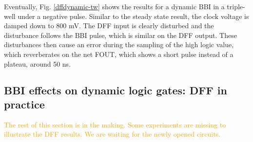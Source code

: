 		
		Eventually, Fig. \ref{dffdynamic-tw} shows the results for a dynamic BBI in a triple-well under a negative pulse.
		Similar to the steady state result, the clock voltage is damped down to 800 mV.
		The DFF input is clearly disturbed and the disturbance follows the BBI pulse, which is similar on the DFF output.
		These disturbances then cause an error during the sampling of the high logic value, which reverberates on the net FOUT, which shows a short pulse instead of a plateau, around 50 ns.
		
\subsection{BBI effects on dynamic logic gates: DFF in practice}
	\textcolor{orange}{The rest of this section is in the making. Some experiments are missing to illustrate the DFF results. We are waiting for the newly opened circuits.}

%
%	
%
